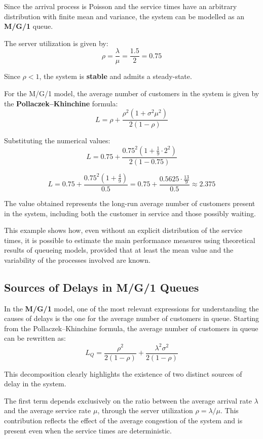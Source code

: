 Since the arrival process is Poisson and the service times have an arbitrary distribution with finite mean and variance, the system can be modelled as an \textbf{M/G/1} queue.

The server utilization is given by:
\[
\rho = \frac{\lambda}{\mu} = \frac{1.5}{2} = 0.75
\]

Since $\rho < 1$, the system is \textbf{stable} and admits a steady-state.

For the M/G/1 model, the average number of customers in the system is given by the \textbf{Pollaczek–Khinchine} formula:
\[
L = \rho + \frac{\rho^2\left(1 + \sigma^2\mu^2\right)}{2(1-\rho)}
\]

Substituting the numerical values:
\[
L = 0.75 + \frac{0.75^2\left(1 + \frac{1}{9}\cdot 2^2\right)}{2(1 - 0.75)}
\]

\[
L = 0.75 + \frac{0.75^2\left(1 + \frac{4}{9}\right)}{0.5}
    = 0.75 + \frac{0.5625 \cdot \frac{13}{9}}{0.5}
    \approx 2.375
\]

The value obtained represents the long-run average number of customers present in the system, including both the customer in service and those possibly waiting.

This example shows how, even without an explicit distribution of the service times, it is possible to estimate the main performance measures using theoretical results of queueing models, provided that at least the mean value and the variability of the processes involved are known.

\subsection{Sources of Delays in M/G/1 Queues}

In the \textbf{M/G/1} model, one of the most relevant expressions for understanding the causes of delays is the one for the average number of customers in queue. Starting from the Pollaczek–Khinchine formula, the average number of customers in queue can be rewritten as:
\[
L_Q = \frac{\rho^2}{2(1-\rho)} + \frac{\lambda^2 \sigma^2}{2(1-\rho)}
\]

This decomposition clearly highlights the existence of two distinct sources of delay in the system.

The first term depends exclusively on the ratio between the average arrival rate $\lambda$ and the average service rate $\mu$, through the server utilization $\rho = \lambda/\mu$. This contribution reflects the effect of the average congestion of the system and is present even when the service times are deterministic.

